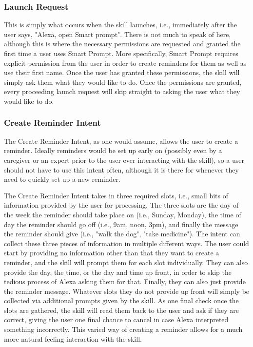 \documentclass[conference]{IEEEtran}
\begin{document}
\subsubsection{Launch Request}

This is simply what occurs when the skill launches, i.e., immediately after the user says, "Alexa, open Smart prompt". 
There is not much to speak of here, although this is where the necessary permissions are requested and granted the first time a user uses Smart Prompt. 
More specifically, Smart Prompt requires explicit permission from the user in order to create reminders for them as well as use their first name. 
Once the user has granted these permissions, the skill will simply ask them what they would like to do. 
Once the permissions are granted, every proceeding launch request will skip straight to asking the user what they would like to do. 

\subsubsection{Create Reminder Intent}

The Create Reminder Intent, as one would assume, allows the user to create a reminder. 
Ideally reminders would be set up early on (possibly even by a caregiver or an expert prior to the user ever interacting with the skill), so a user should not have to use this intent often, although it is there for whenever they need to quickly set up a new reminder. 

The Create Reminder Intent takes in three required slots, i.e., small bits of information provided by the user for processing. 
The three slots are the day of the week the reminder should take place on (i.e., Sunday, Monday), the time of day the reminder should go off (i.e., 9am, noon, 3pm), and finally the message the reminder should give (i.e., "walk the dog", "take medicine").
The intent can collect these three pieces of information in multiple different ways. 
The user could start by providing no information other than that they want to create a reminder, and the skill will prompt them for each slot individually. 
They can also provide the day, the time, or the day and time up front, in order to skip the tedious process of Alexa asking them for that. 
Finally, they can also just provide the reminder message. 
Whatever slots they do not provide up front will simply be collected via additional prompts given by the skill. 
As one final check once the slots are gathered, the skill will read them back to the user and ask if they are correct, giving the user one final chance to cancel in case Alexa interpreted something incorrectly. 
This varied way of creating a reminder allows for a much more natural feeling interaction with the skill. 
\end{document}
